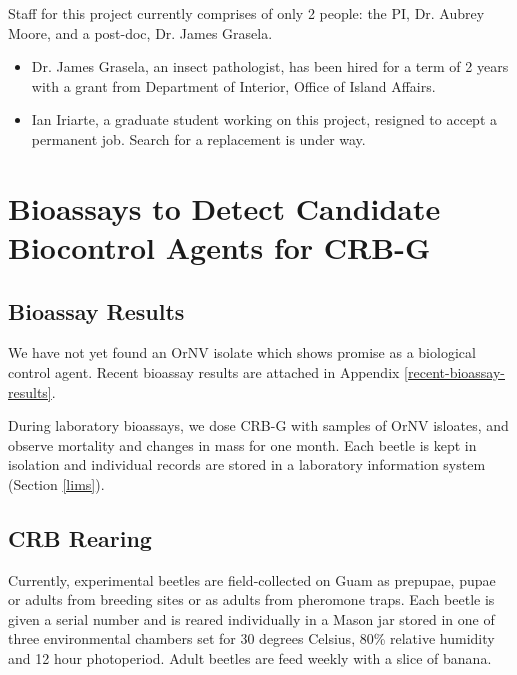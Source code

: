 \documentclass[12pt,letterpaper,english,bibliography=totocnumbered]{scrartcl}
\begin{document}
Staff for this project currently comprises of only 2 people: the PI, Dr. Aubrey Moore, and a post-doc, Dr. James Grasela.
\begin{itemize}

    \item Dr. James Grasela, an insect pathologist, has been hired for a term of 2 years with a grant from Department of Interior, Office of Island Affairs.

    \item Ian Iriarte, a graduate student working on this project, resigned to accept a permanent job. Search for a replacement is under way.

\end{itemize}





\section{Bioassays to Detect Candidate Biocontrol Agents for CRB-G}





\subsection{Bioassay Results}

We have not yet found an OrNV isolate which shows promise as a biological control agent. Recent bioassay results are attached in Appendix \ref{recent-bioassay-results}.

During laboratory bioassays, we dose CRB-G with samples of OrNV isloates, and observe mortality and changes in mass for one month. Each beetle is kept in isolation and individual records are stored in a laboratory information system (Section \ref{lims}).

\subsection{CRB Rearing}

Currently, experimental beetles are field-collected on Guam as prepupae, pupae or adults from breeding sites or as adults from pheromone traps.  Each beetle is given a serial number and is reared individually in a Mason jar stored in one of three environmental chambers set for 30 degrees Celsius, 80\% relative humidity and 12 hour photoperiod. Adult beetles are feed weekly with a slice of banana. 
\end{document}
